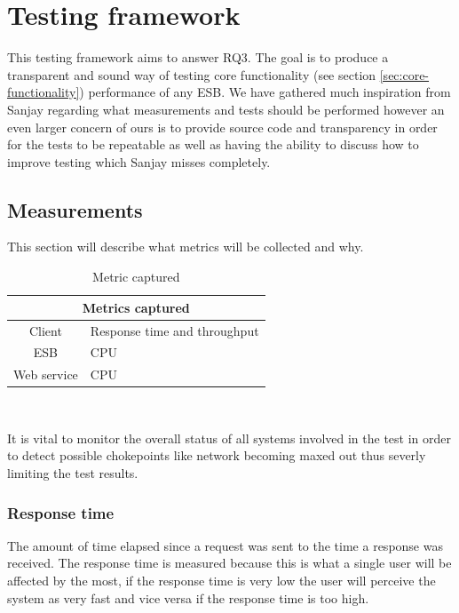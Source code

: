 \section{Testing framework}
This testing framework aims to answer RQ3. The goal is to produce a transparent and sound way of testing core functionality (see section \ref{sec:core-functionality}) performance of any ESB. 
We have gathered much inspiration from Sanjay \cite{Sanjay2011} regarding what measurements and tests should be performed however an even larger concern of ours is to provide source code and transparency in order for the tests to be repeatable as well as having the ability to discuss how to improve testing which Sanjay misses completely.

\subsection{Measurements}
This section will describe what metrics will be collected and why.\\

\begin{table}[H]
	\caption{Metric captured}
	\begin{tabular}{c l}
		\multicolumn{2}{c}{Metrics captured} \\
		\hline
		Client & Response time and throughput \\
		ESB & CPU \\ 
		Web service &  CPU \\
		\hline
	\end{tabular} \\
\end{table}

It is vital to monitor the overall status of all systems involved in the test in order to detect possible chokepoints like network becoming maxed out thus severly limiting the test results.


\subsubsection{Response time}
The amount of time elapsed since a request was sent to the time a response was received. 
The response time is measured because this is what a single user will be affected by the most, if the response time is very low the user will perceive the system as very fast and vice versa if the response time is too high.

